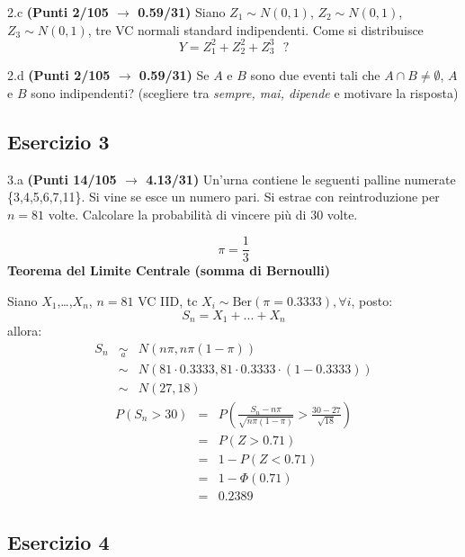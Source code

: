 \documentclass[
  11pt,
]{book}
\theoremstyle{mytheoremstyle}
\theoremstyle{mydefstyle}
\newenvironment{sol}
  {
  \begin{tcolorbox}[enhanced,breakable,arc=0.1mm,boxrule=1pt,colback=white,colframe=iblue,
  title=\bf \fontfamily{lmss}\selectfont \hspace{.5 cm} Soluzione,drop fuzzy shadow]

}{
\end{tcolorbox}
  }
\begin{document}
2.c \textbf{(Punti 2/105 \(\rightarrow\) 0.59/31)} Siano \(Z_1\sim N(0,1)\), \(Z_2\sim N(0,1)\), \(Z_3\sim N(0,1)\), tre VC normali standard indipendenti.
Come si distribuisce
\[
Y=Z_1^2+Z_2^2+Z_3^3~~~?
\]

2.d \textbf{(Punti 2/105 \(\rightarrow\) 0.59/31)} Se \(A\) e \(B\) sono due eventi tali che \(A\cap B\ne\emptyset\), \(A\) e \(B\) sono indipendenti? (scegliere tra \emph{sempre, mai, dipende} e motivare la risposta)

\subsection{Esercizio 3}\label{esercizio-3-32}

3.a \textbf{(Punti 14/105 \(\rightarrow\) 4.13/31)} Un'urna contiene le seguenti palline numerate \{3,4,5,6,7,11\}. Si vine se esce un numero pari. Si estrae con reintroduzione per \(n=81\) volte.
Calcolare la probabilità di vincere più di 30 volte.

\begin{sol}
\[\pi=\frac 13\]
\textbf{Teorema del Limite Centrale (somma di Bernoulli)}

Siano \(X_1\),\ldots,\(X_n\), \(n=81\) VC IID, tc \(X_i\sim\text{Ber}(\pi=0.3333)\)\(,\forall i\), posto:
\[
      S_n = X_1 + ... + X_n
      \]
allora:\begin{eqnarray*}
  S_n & \mathop{\sim}\limits_{a}& N(n\pi,n\pi(1-\pi)) \\
      &\sim & N(81\cdot0.3333,81\cdot0.3333\cdot(1-0.3333)) \\
      &\sim & N(27,18)
  \end{eqnarray*}\begin{eqnarray*}
      P( S_n   >   30 ) 
        &=& P\left(  \frac { S_n  -  n\pi }{ \sqrt{n\pi(1-\pi)} }  >  \frac { 30  -  27 }{\sqrt{ 18 }} \right)  \\
                 &=& P\left(  Z   >   0.71 \right) \\    &=& 1-P(Z< 0.71 )\\ 
                 &=&  1-\Phi( 0.71 ) \\ &=&  0.2389 
      \end{eqnarray*}

\end{sol}

\subsection{Esercizio 4}\label{esercizio-4-32}
\end{document}

